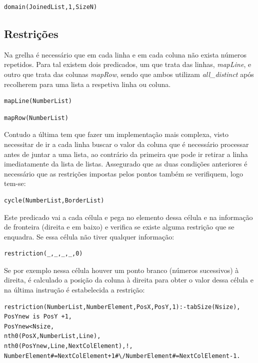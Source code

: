 \documentclass[runningheads,a4paper]{llncs}
\begin{document}
\begin{verbatim}domain(JoinedList,1,SizeN)\end{verbatim}

\subsection{Restrições}

Na grelha é necessário que em cada linha e em cada coluna não exista números repetidos. Para tal existem dois predicados, um que trata das linhas, \textit{mapLine}, e outro que trata das colunas \textit{mapRow}, sendo que ambos utilizam \textit{all\_distinct} após recolherem para uma lista a respetiva linha ou coluna.

\begin{verbatim}mapLine(NumberList)\end{verbatim}
\begin{verbatim}mapRow(NumberList)\end{verbatim}

Contudo a última tem que fazer um implementação mais complexa, visto necessitar de ir a cada linha buscar o valor da coluna que é necessário processar antes de juntar a uma lista, ao contrário da primeira que pode ir retirar a linha imediatamente da lista de listas.
Assegurado que as duas condições anteriores é necessário que as restrições impostas pelos pontos também se verifiquem, logo tem-se:

\begin{verbatim}cycle(NumberList,BorderList)\end{verbatim}


Este predicado vai a cada célula e pega no elemento dessa célula e na informação de fronteira (direita e em baixo) e verifica se existe alguma restrição que se enquadra. Se essa célula não tiver qualquer informação:

\begin{verbatim}restriction(_,_,_,_,0)\end{verbatim}

Se por exemplo nessa célula houver um ponto branco (números sucessivos) à direita, é calculado a posição da coluna à direita para obter o valor dessa célula e na última instrução é estabelecida a restrição:

\begin{verbatim}
restriction(NumberList,NumberElement,PosX,PosY,1):-tabSize(Nsize),
PosYnew is PosY +1,
PosYnew<Nsize,
nth0(PosX,NumberList,Line),
nth0(PosYnew,Line,NextColElement),!,
NumberElement#=NextColElement+1#\/NumberElement#=NextColElement-1.
\end{verbatim}
\end{document}

